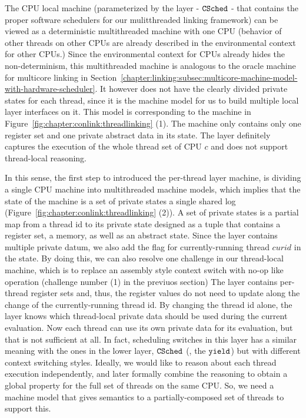 The CPU local machine (parameterized by the layer - ${{\mathrm{\texttt{CSched}}}}$ - that contains the proper software schedulers for our mulitthreaded linking framework)
can be viewed  as a deterministic multithreaded machine with one CPU (behavior of other threads on other CPUs are already described in the environmental context for other CPUs.)
Since the environmental context for CPUs already hides the non-determinism, 
this multithreaded machine is analogous to the oracle machine for multicore linking in Section~\ref{chapter:linking:subsec:multicore-machine-model-with-hardware-scheduler}. 
It however does not have the clearly divided private states for each thread,
since it is the machine model for us to build multiple local layer interfaces on it.
This model is corresponding to the machine in Figure~\ref{fig:chapter:conlink:threadlinking} (1). 
The machine only contains only one register set and one private abstract data in its state.
The layer definitely captures the execution of the whole thread set of CPU $c$ 
and does not support thread-local reasoning.

In this sense, the first step to introduced the per-thread layer machine, 
is dividing a single CPU machine into multithreaded machine models,
which implies that the state of the machine is 
a set of private states a single shared log (Figure~\ref{fig:chapter:conlink:threadlinking} (2)).
A set of private states is a partial map from a thread id to its private state designed as a tuple that contains 
a register set, a memory, as well as an abstract state. 
Since the layer contains multiple private datum, we also add the flag for currently-running thread $curid$ in the state. 
By doing this, we can also resolve one challenge in our thread-local machine, which is to replace an assembly style 
context switch with no-op like operation (challenge number (1) in the previuos section)
The layer contains per-thread register sets and, thus, the register values do not need to update along the change of the currently-running thread id. By changing the thread id alone, the layer knows which thread-local private data should be 
used during the current evaluation.
Now each thread can use its own private data for its evaluation, but that is not sufficient at all. 
In fact, scheduling switches in this layer has a similar meaning with the ones in the lower layer, 
${{\mathrm{\texttt{CSched}}}}$ (\ie, the ${\mathrm{\texttt{yield}}}$) but with different context switching styles.
Ideally, we would like to reason about each thread execution 
independently, and later formally combine the reasoning to obtain a global
property for the full set of threads on the same CPU.
So, we need a machine model that gives semantics to
a partially-composed set of threads to support this.

